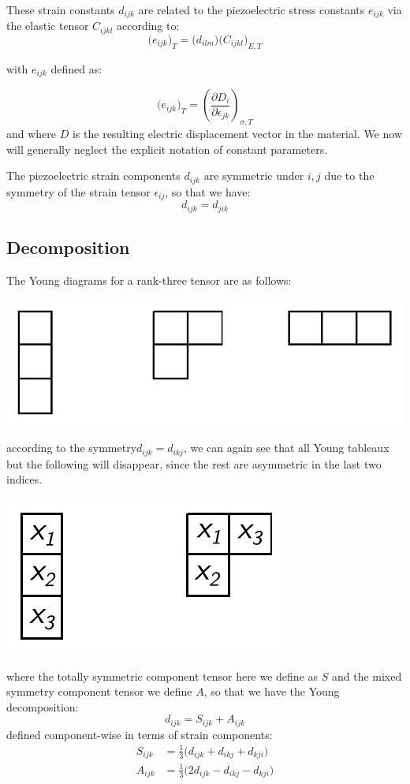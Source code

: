 \documentclass[10pt,a4paper]{article}
\begin{document}
These strain constants $d_{ijk}$ are related to the piezoelectric stress constants $e_{ijk}$ via the elastic tensor $C_{ijkl}$ according to:
$$
\big(e_{ijk}\big)_T=\big(d_{ilm}\big)\big(C_{ijkl}\big)_{E,T}
$$
\begin{center}
with $e_{ijk}$ defined as:
\end{center}
$$
\big(e_{ijk}\big)_{T}=\left(\frac{\partial D_{i}}{\partial \epsilon_{jk}} \right)_{\sigma, T}
$$
and where $D$ is the resulting electric displacement vector in the material. We now will generally neglect the explicit notation of constant parameters.

The piezoelectric strain components $d_{ijk}$ are symmetric under $i,j$ due to the symmetry of the strain tensor $\epsilon_{ij}$, so that we have:
$$
d_{ijk}=d_{jik}
$$

\subsection{Decomposition}
The Young diagrams for a rank-three tensor are as follows:
\begin{center}
\includegraphics[scale=0.7]{youngdiagrams3.pdf}
\end{center}
according to the symmetry$d_{ijk}=d_{ikj}$, we can again see that all Young tableaux but the following will disappear, since the rest are asymmetric in the last two indices.
\begin{center}
\includegraphics[scale=0.7]{piezo_young.pdf}
\end{center}
where the totally symmetric component tensor here we define as $S$ and the mixed symmetry component tensor we define $A$, so that we have the Young decomposition:
$$
d_{ijk} = S_{ijk}+A_{ijk}
$$
defined component-wise in terms of strain components:
\begin{align*}
S_{ijk}&=\frac{1}{3}\big(d_{ijk}+d_{ikj}+d_{kji}\big)\\
A_{ijk}&=\frac{1}{3}\big(2d_{ijk}-d_{ikj}-d_{kji}\big)\\
\end{align*}
\end{document}
